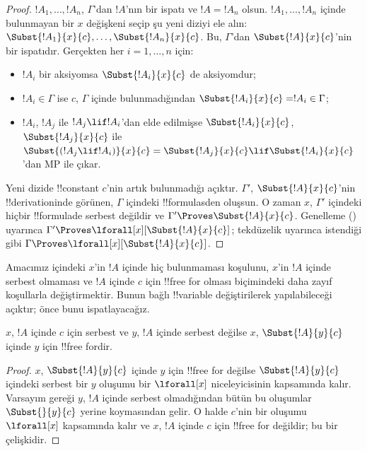\documentclass[../../../include/open-logic-section]{subfiles}
\begin{document}
\begin{proof} $!A_1,\ldots,!A_n$, $\Gamma$'dan $!A$'nın bir ispatı ve
$!A=!A_n$ olsun. $!A_1,\ldots,!A_n$ içinde bulunmayan bir $x$ değişkeni seçip
şu yeni diziyi ele alın:
$\Subst{!A_1}{x}{c},\ldots,\Subst{!A_n}{x}{c}$. Bu, $\Gamma$'dan
$\Subst{!A}{x}{c}$'nin bir ispatıdır. Gerçekten her $i=1,\ldots,n$ için:
\begin{itemize}
\item $!A_i$ bir aksiyomsa $\Subst{!A_i}{x}{c}$ de aksiyomdur;
\item $!A_i \in \Gamma$ ise $c$, $\Gamma$ içinde bulunmadığından
$\Subst{!A_i}{x}{c} = !A_i \in \Gamma$;
\item $!A_i$, $!A_j$ ile $!A_j \lif !A_i$'dan elde edilmişse
$\Subst{!A_i}{x}{c}$, $\Subst{!A_j}{x}{c}$ ile
$\Subst{(!A_j \lif !A_i)}{x}{c} = \Subst{!A_j}{x}{c} \lif
\Subst{!A_i}{x}{c}$'dan MP ile çıkar.
\end{itemize}
Yeni dizide !!{constant} $c$'nin artık bulunmadığı açıktır. $\Gamma'$,
$\Subst{!A}{x}{c}$'nin !!{derivation}{}inde görünen, $\Gamma$ içindeki
!!{formula}s{}den oluşsun. O zaman $x$, $\Gamma'$ içindeki hiçbir !!{formula}{}de
serbest değildir ve $\Gamma' \Proves \Subst{!A}{x}{c}$. Genelleme
() uyarınca
$\Gamma' \Proves \lforall[x][\Subst{!A}{x}{c}]$; tekdüzelik uyarınca
istendiği gibi $\Gamma \Proves \lforall[x][\Subst{!A}{x}{c}]$.
\end{proof}

\begin{explain}
Amacımız  içindeki $x$'in $!A$ içinde hiç bulunmaması
koşulunu, $x$'in $!A$ içinde serbest olmaması ve $!A$ içinde $c$ için
!!{free for} olması biçimindeki daha zayıf koşullarla değiştirmektir. Bunun
bağlı !!{variable} değiştirilerek yapılabileceği açıktır; önce bunu
ispatlayacağız.
\end{explain}

\begin{lem}
$x$, $!A$ içinde $c$ için serbest ve $y$, $!A$ içinde serbest değilse $x$,
$\Subst{!A}{y}{c}$ içinde $y$ için !!{free for}{}dir.
\end{lem}

\begin{proof} $x$, $\Subst{!A}{y}{c}$ içinde $y$ için !!{free for} değilse
$\Subst{!A}{y}{c}$ içindeki serbest bir $y$ oluşumu bir $\lforall[x]$
niceleyicisinin kapsamında kalır. Varsayım gereği $y$, $!A$ içinde serbest
olmadığından bütün bu oluşumlar $\Subst{}{y}{c}$ yerine koymasından gelir.
O halde $c$'nin bir oluşumu $\lforall[x]$ kapsamında kalır ve $x$, $!A$
içinde $c$ için !!{free for} değildir; bu bir çelişkidir.
\end{proof}
\end{document}
